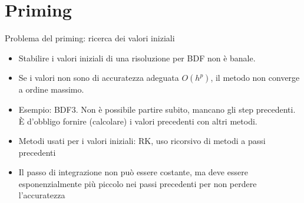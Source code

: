 \documentclass[aspectratio=169, 10pt, handout,usenames,dvipsnames]{beamer}
\begin{document}

\section{Priming}\label{sec:sec7}
    \begin{frame}{Problema del priming: ricerca dei valori iniziali}
        \begin{itemize}
            \item Stabilire i valori iniziali di una risoluzione per BDF non è banale.
            \item Se i valori non sono di accuratezza adeguata $O(h^p)$, il metodo non converge a ordine massimo.
            \item Esempio: BDF3. Non è possibile partire subito, mancano gli step precedenti.\\ 
            È d'obbligo fornire (calcolare) i valori precedenti con altri metodi.
            \item Metodi usati per i valori iniziali: RK, uso ricorsivo di metodi a passi precedenti
            \item Il passo di integrazione non può essere costante, ma deve essere esponenzialmente più piccolo nei passi precedenti per non perdere l'accuratezza
        \end{itemize}   
    \end{frame}
\end{document}
